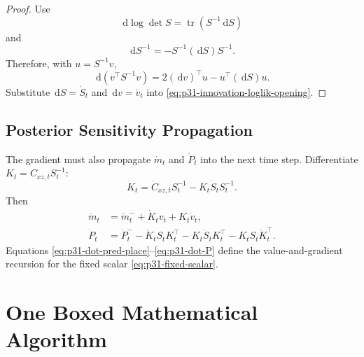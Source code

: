 \documentclass[11pt]{article}
\numberwithin{equation}{section}
\newcommand{\dd}{\,\mathrm d}
\newcommand{\tr}{\operatorname{tr}}
\begin{document}
\begin{proof}
Use
\begin{equation}
  \dd\log\det S=\tr(S^{-1}\dd S)
  \label{eq:p31-d-logdet}
\end{equation}
and
\begin{equation}
  \dd S^{-1}=-S^{-1}(\dd S)S^{-1}.
  \label{eq:p31-d-inverse}
\end{equation}
Therefore, with \(u=S^{-1}v\),
\begin{equation}
  \dd(v^\top S^{-1}v)
  =
  2(\dd v)^\top u-u^\top(\dd S)u.
  \label{eq:p31-d-quadratic}
\end{equation}
Substitute \(\dd S=\dot S_t\) and \(\dd v=\dot v_t\) into
\eqref{eq:p31-innovation-loglik-opening}.
\end{proof}

\subsection{Posterior Sensitivity Propagation}

The gradient must also propagate \(\dot m_t\) and \(\dot P_t\) into the next
time step.  Differentiate \(K_t=C_{xz,t}S_t^{-1}\):
\begin{equation}
  \dot K_t
  =
  \dot C_{xz,t}S_t^{-1}
  -K_t\dot S_tS_t^{-1}.
  \label{eq:p31-dot-K}
\end{equation}
Then
\begin{align}
  \dot m_t
  &=
  \dot m_t^-+\dot K_tv_t+K_t\dot v_t,
  \label{eq:p31-dot-m}\\
  \dot P_t
  &=
  \dot P_t^-
  -\dot K_tS_tK_t^\top
  -K_t\dot S_tK_t^\top
  -K_tS_t\dot K_t^\top.
  \label{eq:p31-dot-P}
\end{align}
Equations \eqref{eq:p31-dot-pred-place}--\eqref{eq:p31-dot-P} define the
value-and-gradient recursion for the fixed scalar
\eqref{eq:p31-fixed-scalar}.

\section{One Boxed Mathematical Algorithm}
\label{sec:p31-boxed-algorithm}
\end{document}
